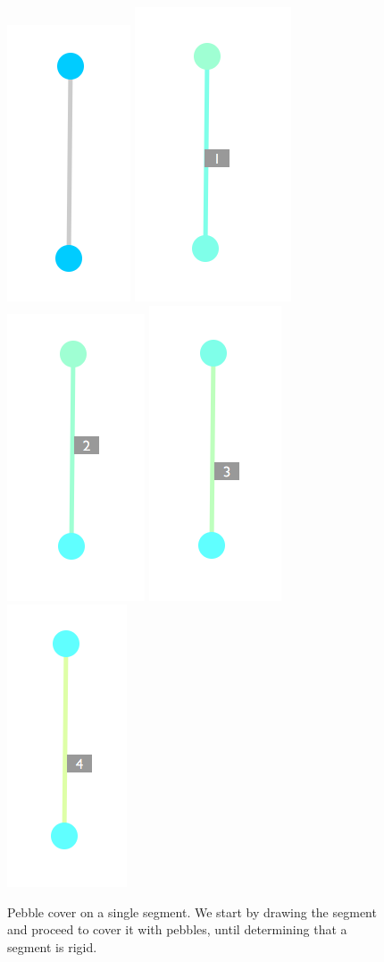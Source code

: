 \documentclass[aps,prd,final,twocolumn,letterpaper,nofootinbib]{revtex4-1}
\begin{document}
\begin{figure}[h]
   \centering
   \includegraphics[width=.19\linewidth]{img/l1}
   \includegraphics[width=.19\linewidth]{img/l2}
   \includegraphics[width=.19\linewidth]{img/l3}
   \includegraphics[width=.19\linewidth]{img/l4}
   \includegraphics[width=.19\linewidth]{img/l5}
   \caption{Pebble cover on a single segment.
   We start by drawing the segment
   and proceed to cover it with pebbles,
   until determining that a segment is rigid.}
   \label{fig:seg}
\end{figure}
\end{document}
